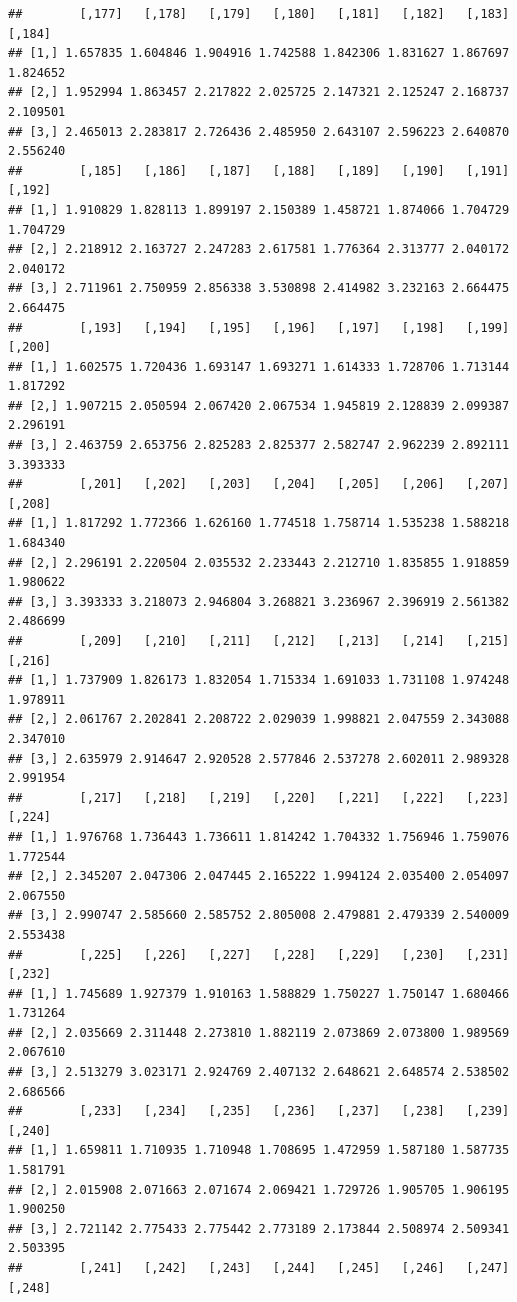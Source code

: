 \documentclass[article]{jss}\usepackage[]{graphicx}\usepackage[]{xcolor}
\makeatletter
\newenvironment{kframe}{%
 \def\at@end@of@kframe{}%
 \ifinner\ifhmode%
  \def\at@end@of@kframe{\end{minipage}}%
  \begin{minipage}{\columnwidth}%
 \fi\fi%
 \def\FrameCommand##1{\hskip\@totalleftmargin \hskip-\fboxsep
 \colorbox{shadecolor}{##1}\hskip-\fboxsep
     \hskip-\linewidth \hskip-\@totalleftmargin \hskip\columnwidth}%
 \MakeFramed {\advance\hsize-\width
   \@totalleftmargin\z@ \linewidth\hsize
   \@setminipage}}%
 {\par\unskip\endMakeFramed%
 \at@end@of@kframe}
\newenvironment{knitrout}{}{} %
\makeatother
\begin{document}
\begin{knitrout}
\begin{kframe}
\begin{verbatim}
##        [,177]   [,178]   [,179]   [,180]   [,181]   [,182]   [,183]   [,184]
## [1,] 1.657835 1.604846 1.904916 1.742588 1.842306 1.831627 1.867697 1.824652
## [2,] 1.952994 1.863457 2.217822 2.025725 2.147321 2.125247 2.168737 2.109501
## [3,] 2.465013 2.283817 2.726436 2.485950 2.643107 2.596223 2.640870 2.556240
##        [,185]   [,186]   [,187]   [,188]   [,189]   [,190]   [,191]   [,192]
## [1,] 1.910829 1.828113 1.899197 2.150389 1.458721 1.874066 1.704729 1.704729
## [2,] 2.218912 2.163727 2.247283 2.617581 1.776364 2.313777 2.040172 2.040172
## [3,] 2.711961 2.750959 2.856338 3.530898 2.414982 3.232163 2.664475 2.664475
##        [,193]   [,194]   [,195]   [,196]   [,197]   [,198]   [,199]   [,200]
## [1,] 1.602575 1.720436 1.693147 1.693271 1.614333 1.728706 1.713144 1.817292
## [2,] 1.907215 2.050594 2.067420 2.067534 1.945819 2.128839 2.099387 2.296191
## [3,] 2.463759 2.653756 2.825283 2.825377 2.582747 2.962239 2.892111 3.393333
##        [,201]   [,202]   [,203]   [,204]   [,205]   [,206]   [,207]   [,208]
## [1,] 1.817292 1.772366 1.626160 1.774518 1.758714 1.535238 1.588218 1.684340
## [2,] 2.296191 2.220504 2.035532 2.233443 2.212710 1.835855 1.918859 1.980622
## [3,] 3.393333 3.218073 2.946804 3.268821 3.236967 2.396919 2.561382 2.486699
##        [,209]   [,210]   [,211]   [,212]   [,213]   [,214]   [,215]   [,216]
## [1,] 1.737909 1.826173 1.832054 1.715334 1.691033 1.731108 1.974248 1.978911
## [2,] 2.061767 2.202841 2.208722 2.029039 1.998821 2.047559 2.343088 2.347010
## [3,] 2.635979 2.914647 2.920528 2.577846 2.537278 2.602011 2.989328 2.991954
##        [,217]   [,218]   [,219]   [,220]   [,221]   [,222]   [,223]   [,224]
## [1,] 1.976768 1.736443 1.736611 1.814242 1.704332 1.756946 1.759076 1.772544
## [2,] 2.345207 2.047306 2.047445 2.165222 1.994124 2.035400 2.054097 2.067550
## [3,] 2.990747 2.585660 2.585752 2.805008 2.479881 2.479339 2.540009 2.553438
##        [,225]   [,226]   [,227]   [,228]   [,229]   [,230]   [,231]   [,232]
## [1,] 1.745689 1.927379 1.910163 1.588829 1.750227 1.750147 1.680466 1.731264
## [2,] 2.035669 2.311448 2.273810 1.882119 2.073869 2.073800 1.989569 2.067610
## [3,] 2.513279 3.023171 2.924769 2.407132 2.648621 2.648574 2.538502 2.686566
##        [,233]   [,234]   [,235]   [,236]   [,237]   [,238]   [,239]   [,240]
## [1,] 1.659811 1.710935 1.710948 1.708695 1.472959 1.587180 1.587735 1.581791
## [2,] 2.015908 2.071663 2.071674 2.069421 1.729726 1.905705 1.906195 1.900250
## [3,] 2.721142 2.775433 2.775442 2.773189 2.173844 2.508974 2.509341 2.503395
##        [,241]   [,242]   [,243]   [,244]   [,245]   [,246]   [,247]   [,248]

\end{verbatim}
\end{kframe}
\end{knitrout}
\end{document}
